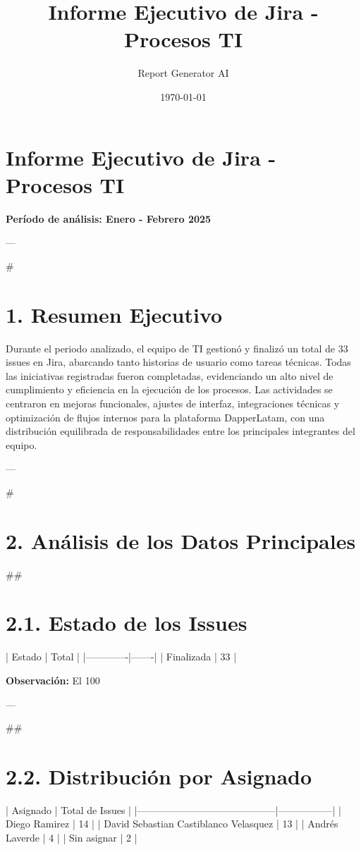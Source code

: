 \documentclass{article}
\title{Informe Ejecutivo de Jira - Procesos TI}
\author{Report Generator AI}
\date{\today}
\begin{document}
\maketitle
\tableofcontents

\section{Informe Ejecutivo de Jira - Procesos TI  }
\textbf{Período de análisis: Enero - Febrero 2025}

---

#\section{1. Resumen Ejecutivo}

Durante el periodo analizado, el equipo de TI gestionó y finalizó un total de 33 issues en Jira, abarcando tanto historias de usuario como tareas técnicas. Todas las iniciativas registradas fueron completadas, evidenciando un alto nivel de cumplimiento y eficiencia en la ejecución de los procesos. Las actividades se centraron en mejoras funcionales, ajustes de interfaz, integraciones técnicas y optimización de flujos internos para la plataforma DapperLatam, con una distribución equilibrada de responsabilidades entre los principales integrantes del equipo.

---

#\section{2. Análisis de los Datos Principales}

##\section{2.1. Estado de los Issues}

| Estado      | Total |
|-------------|-------|
| Finalizada  | 33    |

\textbf{Observación:}  
El 100%

---

##\section{2.2. Distribución por Asignado}

| Asignado                                 | Total de Issues |
|------------------------------------------|-----------------|
| Diego Ramirez                            | 14              |
| David Sebastian Castiblanco Velasquez    | 13              |
| Andrés Laverde                           | 4               |
| Sin asignar                              | 2               |
\end{document}
